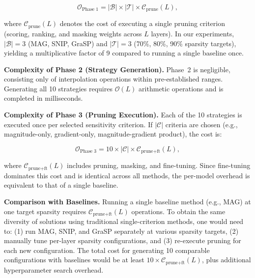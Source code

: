 \documentclass[11pt, conference]{IEEEtran}
\begin{document}
\begin{equation}
\mathcal{O}_{\text{Phase 1}} = |\mathcal{B}| \times |\mathcal{T}| \times \mathcal{C}_{\text{prune}}(L),
\end{equation}

where $\mathcal{C}_{\text{prune}}(L)$ denotes the cost of executing a single pruning criterion (scoring, ranking, and masking weights across $L$ layers). In our experiments, $|\mathcal{B}| = 3$ (MAG, SNIP, GraSP) and $|\mathcal{T}| = 3$ (70\%, 80\%, 90\% sparsity targets), yielding a multiplicative factor of 9 compared to running a single baseline once.

\textbf{Complexity of Phase 2 (Strategy Generation).}
Phase~2 is negligible, consisting only of interpolation operations within pre-established ranges. Generating all 10 strategies requires $\mathcal{O}(L)$ arithmetic operations and is completed in milliseconds.

\textbf{Complexity of Phase 3 (Pruning Execution).}
Each of the 10 strategies is executed once per selected sensitivity criterion. If $|\mathcal{C}|$ criteria are chosen (e.g., magnitude-only, gradient-only, magnitude-gradient product), the cost is:

\begin{equation}
\mathcal{O}_{\text{Phase 3}} = 10 \times |\mathcal{C}| \times \mathcal{C}_{\text{prune+ft}}(L),
\end{equation}

where $\mathcal{C}_{\text{prune+ft}}(L)$ includes pruning, masking, and fine-tuning. Since fine-tuning dominates this cost and is identical across all methods, the per-model overhead is equivalent to that of a single baseline.

\textbf{Comparison with Baselines.}
Running a single baseline method (e.g., MAG) at one target sparsity requires $\mathcal{C}_{\text{prune+ft}}(L)$ operations. To obtain the same diversity of solutions using traditional single-criterion methods, one would need to: (1) run MAG, SNIP, and GraSP separately at various sparsity targets, (2) manually tune per-layer sparsity configurations, and (3) re-execute pruning for each new configuration. The total cost for generating 10 comparable configurations with baselines would be at least $10 \times \mathcal{C}_{\text{prune+ft}}(L)$, plus additional hyperparameter search overhead.
\end{document}
